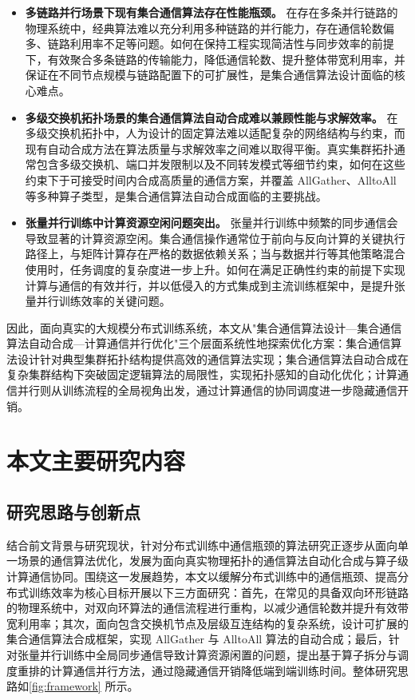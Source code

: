 \begin{itemize}
    \item [（1）] \textbf{多链路并行场景下现有集合通信算法存在性能瓶颈。} 在存在多条并行链路的物理系统中，经典算法难以充分利用多种链路的并行能力，存在通信轮数偏多、链路利用率不足等问题。如何在保持工程实现简洁性与同步效率的前提下，有效聚合多条链路的传输能力，降低通信轮数、提升整体带宽利用率，并保证在不同节点规模与链路配置下的可扩展性，是集合通信算法设计面临的核心难点。
    \item [（2）] \textbf{多级交换机拓扑场景的集合通信算法自动合成难以兼顾性能与求解效率。} 在多级交换机拓扑中，人为设计的固定算法难以适配复杂的网络结构与约束，而现有自动合成方法在算法质量与求解效率之间难以取得平衡。真实集群拓扑通常包含多级交换机、端口并发限制以及不同转发模式等细节约束，如何在这些约束下于可接受时间内合成高质量的通信方案，并覆盖 AllGather、AlltoAll 等多种算子类型，是集合通信算法自动合成面临的主要挑战。
    \item [（3）] \textbf{张量并行训练中计算资源空闲问题突出。} 张量并行训练中频繁的同步通信会导致显著的计算资源空闲。集合通信操作通常位于前向与反向计算的关键执行路径上，与矩阵计算存在严格的数据依赖关系；当与数据并行等其他策略混合使用时，任务调度的复杂度进一步上升。如何在满足正确性约束的前提下实现计算与通信的有效并行，并以低侵入的方式集成到主流训练框架中，是提升张量并行训练效率的关键问题。
\end{itemize}

因此，面向真实的大规模分布式训练系统，本文从"集合通信算法设计—集合通信算法自动合成—计算通信并行优化"三个层面系统性地探索优化方案：集合通信算法设计针对典型集群拓扑结构提供高效的通信算法实现；集合通信算法自动合成在复杂集群结构下突破固定逻辑算法的局限性，实现拓扑感知的自动化优化；计算通信并行则从训练流程的全局视角出发，通过计算通信的协同调度进一步隐藏通信开销。



\section{本文主要研究内容}

\subsection{研究思路与创新点}

结合前文背景与研究现状，针对分布式训练中通信瓶颈的算法研究正逐步从面向单一场景的通信算法优化，发展为面向真实物理拓扑的通信算法自动化合成与算子级计算通信协同。围绕这一发展趋势，本文以缓解分布式训练中的通信瓶颈、提高分布式训练效率为核心目标开展以下三方面研究：首先，在常见的具备双向环形链路的物理系统中，对双向环算法的通信流程进行重构，以减少通信轮数并提升有效带宽利用率；其次，面向包含交换机节点及层级互连结构的复杂系统，设计可扩展的集合通信算法合成框架，实现 AllGather 与 AlltoAll 算法的自动合成；最后，针对张量并行训练中全局同步通信导致计算资源闲置的问题，提出基于算子拆分与调度重排的计算通信并行方法，通过隐藏通信开销降低端到端训练时间。整体研究思路如\autoref{fig:framework} 所示。

